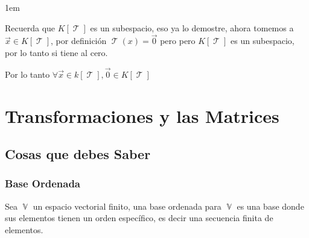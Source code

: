\documentclass[12pt, fleqn]{report}                             %
\newenvironment{SmallIndentation}[1][0.75em]                    %
        {\begin{adjustwidth}{#1}{}\begin{footnotesize}}             %
        {\end{footnotesize}\end{adjustwidth}}                       %
\theoremstyle{break}                                            %
\DeclareMathOperator \VectorSet    {\mathbb{V}}                 %
\DeclareMathOperator \LinTrans {\mathcal{T}}                    %
\begin{document}
\begin{itemize}
\begin{SmallIndentation}[1em]
                            Recuerda que $K[\LinTrans]$ es un subespacio, eso ya lo demostre, ahora tomemos 
                            a $\vec x \in K[\LinTrans]$, por definición $\LinTrans(x) = \vec 0$
                            pero pero $K[\LinTrans]$ es un subespacio, por lo tanto si tiene al cero.
                            
                            Por lo tanto
                            $\forall \vec x \in k[\LinTrans], \vec 0 \in K[\LinTrans]$
                        
                        \end{SmallIndentation}
                            
                \end{itemize}


    \chapter{Transformaciones y las Matrices}


        \clearpage
        \section{Cosas que debes Saber}

            \subsection{Base Ordenada}

                Sea $\VectorSet$ un espacio vectorial finito, una base ordenada para $\VectorSet$
                es una base donde sus elementos tienen un orden específico, es decir una secuencia
                finita de elementos.

\end{document}
